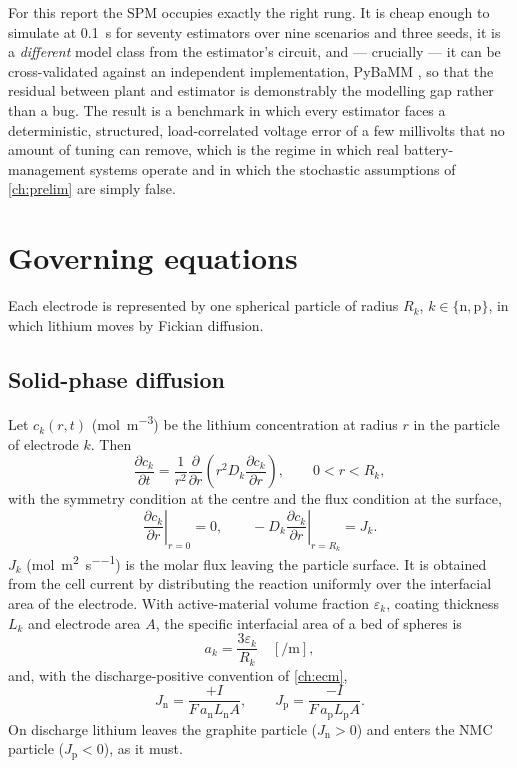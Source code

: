 For this report the SPM occupies exactly the right rung. It is cheap enough to simulate at
\SI{0.1}{\second} for seventy estimators over nine scenarios and three seeds, it is a
\emph{different} model class from the estimator's circuit, and --- crucially --- it can be
cross-validated against an independent implementation, PyBaMM \cite{sulzer2021pybamm}, so that
the residual between plant and estimator is demonstrably the modelling gap rather than a bug.
The result is a benchmark in which every estimator faces a deterministic, structured,
load-correlated voltage error of a few millivolts that no amount of tuning can remove, which is
the regime in which real battery-management systems operate and in which the stochastic
assumptions of \cref{ch:prelim} are simply false.

\section{Governing equations}
\label{sec:spm-eqs}

Each electrode is represented by one spherical particle of radius $R_k$, $k\in\{\mathrm{n},\mathrm{p}\}$,
in which lithium moves by Fickian diffusion.

\subsection{Solid-phase diffusion}
Let $c_k(r,t)$ (\si{\mole\per\cubic\metre}) be the lithium concentration at radius $r$ in the
particle of electrode $k$. Then
\begin{equation}
\frac{\partial c_k}{\partial t}
 = \frac{1}{r^{2}}\frac{\partial}{\partial r}\!\left(r^{2}D_k\frac{\partial c_k}{\partial r}\right),
\qquad 0 < r < R_k,
\label{eq:spm-diffusion}
\end{equation}
with the symmetry condition at the centre and the flux condition at the surface,
\begin{equation}
\left.\frac{\partial c_k}{\partial r}\right|_{r=0} = 0,
\qquad
-D_k\left.\frac{\partial c_k}{\partial r}\right|_{r=R_k} = J_k .
\label{eq:spm-bc}
\end{equation}
$J_k$ (\si{\mole\per\square\metre\per\second}) is the molar flux leaving the particle surface.
It is obtained from the cell current by distributing the reaction uniformly over the interfacial
area of the electrode. With active-material volume fraction $\varepsilon_k$, coating thickness
$L_k$ and electrode area $A$, the specific interfacial area of a bed of spheres is
\begin{equation}
a_k = \frac{3\varepsilon_k}{R_k} \quad[\si{\per\metre}],
\label{eq:spm-area}
\end{equation}
and, with the discharge-positive convention of \cref{ch:ecm},
\begin{equation}
J_{\mathrm{n}} = \frac{+I}{F\,a_{\mathrm{n}}L_{\mathrm{n}}A},
\qquad
J_{\mathrm{p}} = \frac{-I}{F\,a_{\mathrm{p}}L_{\mathrm{p}}A} .
\label{eq:spm-flux}
\end{equation}
On discharge lithium leaves the graphite particle ($J_{\mathrm{n}}>0$) and enters the NMC
particle ($J_{\mathrm{p}}<0$), as it must.


